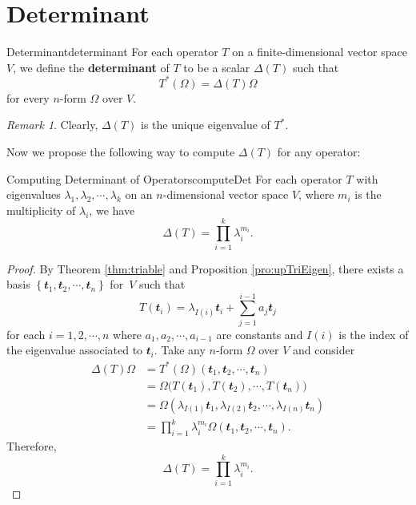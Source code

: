 \documentclass[math]{amznotes}
\theoremstyle{remark}
\newtheorem*{remark}{Remark}
\begin{document}
\section{Determinant}
\begin{dfnbox}{Determinant}{determinant}
    For each operator $T$ on a finite-dimensional vector space $V$, we define the {\color{red} \textbf{determinant}} of $T$ to be a scalar $\Delta(T)$ such that 
    \begin{equation*}
        T^*(\Omega) = \Delta(T)\Omega
    \end{equation*}
    for every $n$-form $\Omega$ over $V$.
\end{dfnbox}
\begin{notebox}
    \begin{remark}
        Clearly, $\Delta(T)$ is the unique eigenvalue of $T^*$.
    \end{remark}
\end{notebox}
Now we propose the following way to compute $\Delta(T)$ for any operator:
\begin{probox}{Computing Determinant of Operators}{computeDet}
    For each operator $T$ with eigenvalues $\lambda_1, \lambda_2, \cdots, \lambda_k$ on an $n$-dimensional vector space $V$, where $m_i$ is the multiplicity of $\lambda_i$, we have 
    \begin{equation*}
        \Delta(T) = \prod_{i = 1}^{k}\lambda_i^{m_i}.
    \end{equation*}
    \tcblower
    \begin{proof}
        By Theorem \ref{thm:triable} and Proposition \ref{pro:upTriEigen}, there exists a basis $\left\{\mathbfit{t}_1, \mathbfit{t}_2, \cdots, \mathbfit{t}_n\right\}$ for~$V$ such that 
        \begin{equation*}
            T\left(\mathbfit{t}_i\right) = \lambda_{I(i)}\mathbfit{t}_i + \sum_{j = 1}^{i - 1}a_j\mathbfit{t}_j
        \end{equation*}
        for each $i = 1, 2, \cdots, n$ where $a_1, a_2, \cdots, a_{i - 1}$ are constants and $I(i)$ is the index of the eigenvalue associated to $\mathbfit{t}_i$. Take any $n$-form $\Omega$ over $V$ and consider 
        \begin{align*}
            \Delta(T)\Omega & = T^*(\Omega)\left(\mathbfit{t}_1, \mathbfit{t}_2, \cdots, \mathbfit{t}_n\right) \\
            & = \Omega\bigl(T(\mathbfit{t}_1), T(\mathbfit{t}_2), \cdots, T(\mathbfit{t}_n)\bigr) \\
            & = \Omega\left(\lambda_{I(1)}\mathbfit{t}_1, \lambda_{I(2)}\mathbfit{t}_2, \cdots, \lambda_{I(n)}\mathbfit{t}_n\right) \\
            & = \prod_{i = 1}^k\lambda_i^{m_i}\Omega\left(\mathbfit{t}_1, \mathbfit{t}_2, \cdots, \mathbfit{t}_n\right).
        \end{align*}
        Therefore, 
        \begin{equation*}
            \Delta(T) = \prod_{i = 1}^{k}\lambda_i^{m_i}.
        \end{equation*}
    \end{proof}
\end{probox}
\end{document}
